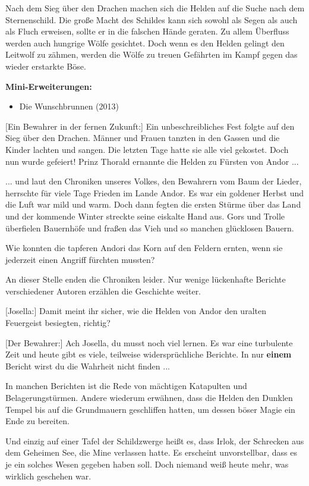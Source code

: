 \documentclass[10pt, a4paper, oneside]{book}
\begin{document}
\begin{multicols}{2}
Nach dem Sieg über den Drachen machen sich die Helden auf die Suche nach dem Sternenschild. Die große Macht des Schildes kann sich sowohl als Segen als auch als Fluch erweisen, sollte er in die falschen Hände geraten. Zu allem Überfluss werden auch hungrige Wölfe gesichtet. Doch wenn es den Helden gelingt den Leitwolf zu zähmen, werden die Wölfe zu treuen Gefährten im Kampf gegen das wieder erstarkte Böse.\bigskip

\textbf{Mini-Erweiterungen:}
\begin{itemize}[topsep=0pt,itemsep=-1ex,partopsep=1ex,parsep=1ex]
    \item Die Wunschbrunnen (2013)\bigskip
\end{itemize}


[Ein Bewahrer in der fernen Zukunft:] Ein unbeschreibliches Fest folgte auf den Sieg über den Drachen.
Männer und Frauen tanzten in den Gassen und die Kinder lachten und sangen. Die letzten Tage hatte sie alle viel gekostet. Doch nun wurde gefeiert! Prinz Thorald ernannte die Helden zu Fürsten von Andor ...

... und laut den Chroniken unseres Volkes, den Bewahrern vom Baum der Lieder, herrschte für viele Tage Frieden im Lande Andor. Es war ein goldener Herbst und die Luft war mild und warm. Doch dann fegten die ersten Stürme über das Land und der kommende Winter streckte seine eiskalte Hand aus. Gors und Trolle überfielen Bauernhöfe und fraßen das Vieh und so manchen glücklosen Bauern.

Wie konnten die tapferen Andori das Korn auf den Feldern ernten, wenn sie jederzeit einen Angriff fürchten mussten?

An dieser Stelle enden die Chroniken leider. Nur wenige lückenhafte Berichte verschiedener Autoren erzählen die Geschichte weiter.

[Josella:] Damit meint ihr sicher, wie die Helden von Andor den uralten Feuergeist besiegten, richtig?

[Der Bewahrer:] Ach Josella, du musst noch viel lernen. Es war eine turbulente Zeit und heute gibt es viele, teilweise widersprüchliche Berichte. In nur \textbf{einem} Bericht wirst du die Wahrheit nicht finden ...

In manchen Berichten ist die Rede von mächtigen Katapulten und Belagerungstürmen. Andere wiederum erwähnen, dass die Helden den Dunklen Tempel bis auf die Grundmauern geschliffen hatten, um dessen böser Magie ein Ende zu bereiten.

Und einzig auf einer Tafel der Schildzwerge heißt es, dass Irlok, der Schrecken aus dem Geheimen See, die Mine verlassen hatte. Es erscheint unvorstellbar, dass es je ein solches Wesen gegeben haben soll. Doch niemand weiß heute mehr, was wirklich geschehen war.


\end{multicols}
\end{document}
